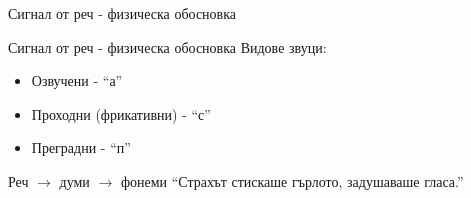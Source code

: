 \documentclass[9pt]{beamer}
\begin{document}
    \begin{frame}{Сигнал от реч - физическа обосновка}
    \end{frame}

    \begin{frame}{Сигнал от реч - физическа обосновка}
    Видове звуци:
    \vspace{1cm} \leavevmode \newline
    \pause
    \begin{itemize}
        \item Озвучени - ``а''
        \pause
        \item Проходни (фрикативни) - ``с''
        \pause
        \item Преградни - ``п'' 
    \end{itemize}
    \vspace{1cm}
    \pause
    Реч \pause$\rightarrow$ думи \pause $\rightarrow$ фонеми 
    \vspace{1cm} \leavevmode \newline
    \pause
    ``Страхът стискаше гърлото, задушаваше гласа.''
    \end{frame}
\end{document}
